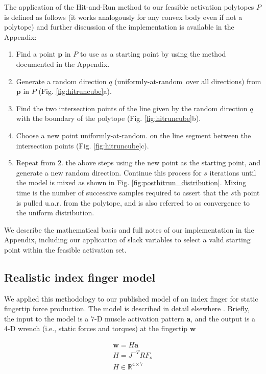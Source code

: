 \documentclass[10pt,letterpaper]{article}
\begin{document}
The application of the Hit-and-Run method to our feasible activation polytopes $P$ is defined as follows (it works analogously for any convex body even if not a polytope)\cite{lovasz1999hit} and further discussion of the implementation is available in the Appendix:

\begin{enumerate}
\item Find a point $\textbf{p}$ in $P$ to use as a starting point by using the method documented in the Appendix.
\item Generate a random direction $q$ (uniformly-at-random\ over all directions) from $\textbf{p}$ in $P$  (Fig. \ref{fig:hitruncube}a).
\item Find the two intersection points of the line given by the random direction $q$ with the boundary of the polytope (Fig. \ref{fig:hitruncube}b).
\item Choose a new point uniformly-at-random. on the line segment between  the intersection points (Fig. \ref{fig:hitruncube}c). 
\item Repeat from $2.$ the above steps using the new point as the starting point, and generate a new random direction. Continue this process for $s$ iterations until the model is mixed as shown in Fig. \ref{fig:posthitrun_distribution}. Mixing time is the number of successive samples required to assert that the $s$th point is pulled u.a.r. from the polytope, and is also referred to as convergence to the uniform distribution.
\end{enumerate}



We describe the mathematical basis and full notes of our implementation in the Appendix, including our application of slack variables to select a valid starting point within the feasible activation set.

\subsection*{Realistic index finger model}
\label{ss:finger}
We  applied this methodology to our published model of an index finger for static fingertip force production. The model is described in detail elsewhere \cite{Valero-Cuevas1998Large,Valero-Cuevas2000Scaling,valero-cuevas2009computational}. 
Briefly, the input to the model is a 7-D muscle activation pattern $\textbf{a}$, and the output is a 4-D  wrench (i.e., static forces and torques) at the fingertip  $\textbf{w}$

\begin{eqnarray}
\textbf{w} = H  \textbf{a} \\
H=J^{-T}RF_o  \\
H \in \mathbb{R}^{4 \times 7} 
\end{eqnarray}
\end{document}
